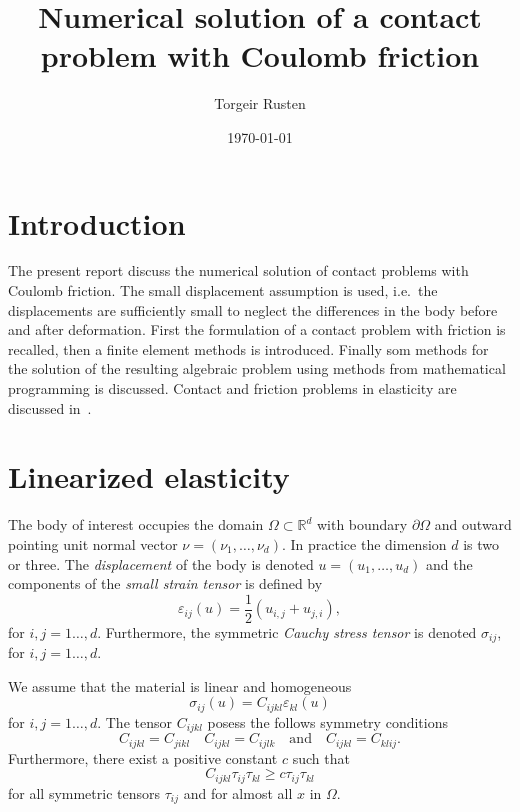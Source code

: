 \documentclass[12pt,a4paper]{article}
\title{Numerical solution of a contact problem with {Coulomb} friction}
\author{Torgeir Rusten}
\date{\today}
\numberwithin{equation}{section}
\numberwithin{table}{section}
\numberwithin{figure}{section}
\newcommand{\dOmega}{{\partial\Omega}}
\renewcommand{\epsilon}{\varepsilon}
\newcommand{\strain}[1][]{\ensuremath{\epsilon_{#1}}}
\newcommand{\epsij}{\strain[ij]}
\newcommand{\epskl}{\strain[kl]}
\newcommand{\stress}[1][]{\ensuremath{\sigma_{#1}}}
\newcommand{\sigij}{\stress[ij]}
\begin{document}
\maketitle

\section{Introduction}
\label{sec:introduction}

The present report discuss the numerical solution of contact problems
with Coulomb friction. The small displacement assumption is used, i.e.\
the displacements are sufficiently small to neglect the differences in
the body before and after deformation.  First the formulation of a
contact problem with friction is recalled, then a finite element
methods is introduced.  Finally som methods for the solution of the
resulting algebraic problem using methods from mathematical
programming is discussed.  Contact and friction problems in elasticity
are discussed in~\cite{kikuchi88:contac-elast}.


\section{Linearized elasticity}

The body of interest occupies the domain $\Omega\subset\mathbb{R}^d$ with boundary $\dOmega$ and outward pointing unit normal vector $\nu = (\nu_1, \ldots, \nu_d)$. In practice the
dimension $d$ is two or three.  The \emph{displacement} of the body is denoted
$u=(u_1,\ldots,u_d)$ and the components of the \emph{small strain tensor} is defined by
\begin{equation}
\epsij(u) = \frac{1}{2} (u_{i,j} + u_{j,i}),
\end{equation}
for $i,j=1\ldots,d$.  Furthermore, the symmetric \emph{Cauchy stress tensor} is denoted
\sigij, for $i,j=1\ldots,d$.

We assume that the material is linear and homogeneous
\begin{equation}\label{hook}
\sigij(u) = C_{ijkl}\epskl(u)
\end{equation}
for $i,j=1\ldots,d$. The tensor $C_{ijkl}$ posess the follows symmetry conditions
\[ C_{ijkl} = C_{jikl}\quad C_{ijkl}=C_{ijlk}\quad\text{and}\quad
C_{ijkl} = C_{klij}.\]
Furthermore, there exist a positive constant $c$ such that
\begin{equation}
\label{eq:HookPositive}
C_{ijkl}\tau_{ij}\tau_{kl} \ge c \tau_{ij}\tau_{kl}
\end{equation}
for all symmetric tensors $\tau_{ij}$ and for almost all $x$ in $\Omega$.
\end{document}
